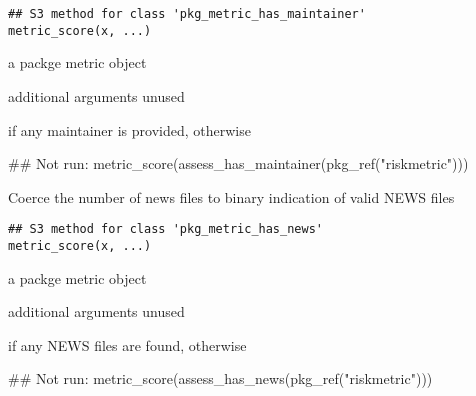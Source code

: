 \documentclass[a4paper]{book}
\begin{document}
%
\begin{Usage}
\begin{verbatim}
## S3 method for class 'pkg_metric_has_maintainer'
metric_score(x, ...)
\end{verbatim}
\end{Usage}
%
\begin{Arguments}
\begin{ldescription}
\item[\code{x}] a  packge metric object

\item[\code{...}] additional arguments unused
\end{ldescription}
\end{Arguments}
%
\begin{Value}
 if any maintainer is provided, otherwise 
\end{Value}
%
\begin{Examples}
\begin{ExampleCode}
## Not run: metric_score(assess_has_maintainer(pkg_ref("riskmetric")))

\end{ExampleCode}
\end{Examples}
%
\begin{Description}
Coerce the number of news files to binary indication of valid NEWS files
\end{Description}
%
\begin{Usage}
\begin{verbatim}
## S3 method for class 'pkg_metric_has_news'
metric_score(x, ...)
\end{verbatim}
\end{Usage}
%
\begin{Arguments}
\begin{ldescription}
\item[\code{x}] a  packge metric object

\item[\code{...}] additional arguments unused
\end{ldescription}
\end{Arguments}
%
\begin{Value}
 if any NEWS files are found, otherwise 
\end{Value}
%
\begin{Examples}
\begin{ExampleCode}
## Not run: metric_score(assess_has_news(pkg_ref("riskmetric")))

\end{ExampleCode}
\end{Examples}
\end{document}
